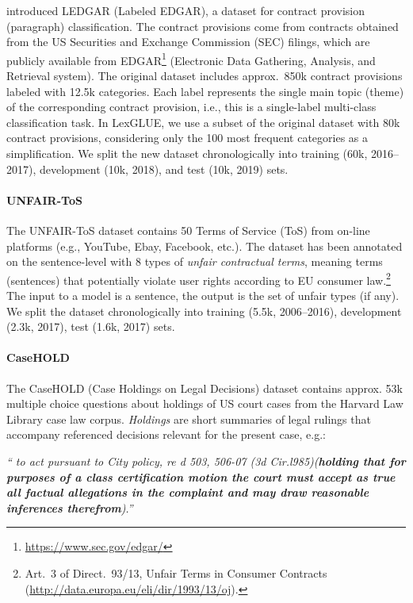 \documentclass[11pt]{article}
\begin{document}
\citet{tuggener-etal-2020-ledgar} introduced LEDGAR (Labeled EDGAR), a dataset for contract provision (paragraph) classification. The contract provisions come from contracts obtained from the US Securities and Exchange Commission (SEC) filings, which are publicly available from EDGAR\footnote{\url{https://www.sec.gov/edgar/}} (Electronic Data Gathering, Analysis, and Retrieval system).
The original dataset includes approx.\ 850k contract provisions labeled with 12.5k categories. Each label represents the single main topic (theme) of the corresponding contract provision, i.e., this is a single-label multi-class classification task. In LexGLUE, we use a subset of the original dataset with 80k contract provisions, considering only the 100 most frequent categories as a simplification. We split the new dataset chronologically into training (60k, 2016--2017), development (10k, 2018), and test (10k, 2019) sets.

\paragraph{UNFAIR-ToS} The UNFAIR-ToS dataset \cite{lippi-etal-2019-claudette} contains 50 Terms of Service (ToS) from on-line platforms (e.g., YouTube, Ebay, Facebook, etc.). The dataset has been annotated on the sentence-level with 8 types of \emph{unfair contractual terms}, meaning terms (sentences) that potentially violate user rights according to EU consumer law.\footnote{Art.\ 3 of Direct.\ 93/13, Unfair Terms in Consumer Contracts (\url{http://data.europa.eu/eli/dir/1993/13/oj}).} The input to a model is a sentence, the output is the set of unfair types (if any). We split the dataset chronologically into training (5.5k, 2006--2016), development (2.3k, 2017),  test (1.6k, 2017) sets.

\paragraph{CaseHOLD}
The CaseHOLD (Case Holdings on Legal Decisions) dataset \cite{zhengguha2021} contains approx. 53k multiple choice questions about holdings of US court cases from the Harvard Law Library case law corpus. \emph{Holdings} are short summaries of legal rulings that accompany referenced decisions relevant for the present case, e.g.:\vspace{1mm}

\noindent
\emph{`` to act pursuant to City policy, re d 503, 506-07 (3d Cir.l985)(\textbf{holding that for purposes of a class certification motion the court must accept as true all factual allegations in the complaint and may draw reasonable inferences therefrom}).''}\vspace{1mm}
\end{document}
